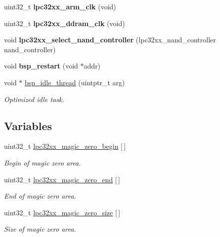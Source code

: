 \begin{DoxyCompactItemize}
\item 
\mbox{\label{group__RTEMSBSPsARMLPC32XX_ga46599f9cee5517f6e762b0d44610bc75}} 
uint32\+\_\+t {\bfseries lpc32xx\+\_\+arm\+\_\+clk} (void)
\item 
\mbox{\label{group__RTEMSBSPsARMLPC32XX_ga7d83c7b61e0d9583515cd6b14df6059e}} 
uint32\+\_\+t {\bfseries lpc32xx\+\_\+ddram\+\_\+clk} (void)
\item 
\mbox{\label{group__RTEMSBSPsARMLPC32XX_ga7f979ca0ac46061e5fd931c14c3f9404}} 
void {\bfseries lpc32xx\+\_\+select\+\_\+nand\+\_\+controller} (lpc32xx\+\_\+nand\+\_\+controller nand\+\_\+controller)
\item 
\mbox{\label{group__RTEMSBSPsARMLPC32XX_ga22e8ff0c484a388835087ab82844fa5b}} 
void {\bfseries bsp\+\_\+restart} (void $\ast$addr)
\item 
void $\ast$ \mbox{\hyperlink{group__RTEMSBSPsARMLPC32XX_ga4617d29eb64a6f41a54d9f997b97d758}{bsp\+\_\+idle\+\_\+thread}} (uintptr\+\_\+t arg)
\begin{DoxyCompactList}\small\item\em Optimized idle task. \end{DoxyCompactList}\end{DoxyCompactItemize}
\subsection*{Variables}
\begin{DoxyCompactItemize}
\item 
uint32\+\_\+t \mbox{\hyperlink{group__RTEMSBSPsARMLPC32XX_gaa6841126b9e102ad39285c888ca1fff1}{lpc32xx\+\_\+magic\+\_\+zero\+\_\+begin}} \mbox{[}$\,$\mbox{]}
\begin{DoxyCompactList}\small\item\em Begin of magic zero area. \end{DoxyCompactList}\item 
uint32\+\_\+t \mbox{\hyperlink{group__RTEMSBSPsARMLPC32XX_gabc9033f3923cd6a1ac5052c4c47a8932}{lpc32xx\+\_\+magic\+\_\+zero\+\_\+end}} \mbox{[}$\,$\mbox{]}
\begin{DoxyCompactList}\small\item\em End of magic zero area. \end{DoxyCompactList}\item 
uint32\+\_\+t \mbox{\hyperlink{group__RTEMSBSPsARMLPC32XX_gaf20b43708e6813b3d546eabdcba5ca40}{lpc32xx\+\_\+magic\+\_\+zero\+\_\+size}} \mbox{[}$\,$\mbox{]}
\begin{DoxyCompactList}\small\item\em Size of magic zero area. \end{DoxyCompactList}\end{DoxyCompactItemize}


